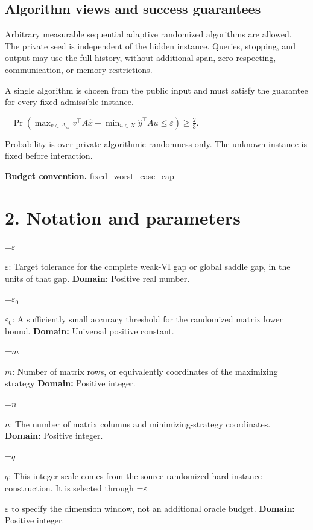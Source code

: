 \documentclass[10pt,a4paper]{article}
\newcommand{\AtlasMath}[1]{\par\begingroup\centering\setbox0=\hbox{$\displaystyle #1$}\ifdim\wd0>1.4\linewidth\typeout{ATLAS WIDE FORMULA: \the\wd0}\fi\ifdim\wd0>\linewidth\resizebox{\linewidth}{!}{\box0}\else\box0\fi\par\endgroup}
\newcommand{\AtlasInlineMath}[1]{\begingroup\setbox0=\hbox{$#1$}\ifdim\wd0>.4\linewidth\endgroup\AtlasMath{#1}\else\endgroup$#1$\fi}
\begin{document}
\subsection{Algorithm views and success guarantees}


Arbitrary measurable sequential adaptive randomized algorithms are allowed. The private seed is independent of the hidden instance. Queries, stopping, and output may use the full history, without additional span, zero-respecting, communication, or memory restrictions.



A single algorithm is chosen from the public input and must satisfy the guarantee for every fixed admissible instance.




\AtlasMath{\Pr\!\left(\max_{v\in\Delta_m}v^\top A\widehat{x}-\min_{u\in X}\widehat{y}^\top Au\le\varepsilon\right)\ge\frac23.}




Probability is over private algorithmic randomness only. The unknown instance is fixed before interaction.



\textbf{Budget convention.} fixed\_worst\_case\_cap



\section{2. Notation and parameters}


\AtlasInlineMath{\varepsilon}: Target tolerance for the complete weak-VI gap or global saddle gap, in the units of that gap. \textbf{Domain:} Positive real number.



\AtlasInlineMath{\varepsilon_0}: A sufficiently small accuracy threshold for the randomized matrix lower bound. \textbf{Domain:} Universal positive constant.



\AtlasInlineMath{m}: Number of matrix rows, or equivalently coordinates of the maximizing strategy \textbf{Domain:} Positive integer.



\AtlasInlineMath{n}: The number of matrix columns and minimizing-strategy coordinates. \textbf{Domain:} Positive integer.



\AtlasInlineMath{q}: This integer scale comes from the source randomized hard-instance construction. It is selected through \AtlasInlineMath{\varepsilon} to specify the dimension window, not an additional oracle budget. \textbf{Domain:} Positive integer.
\end{document}
